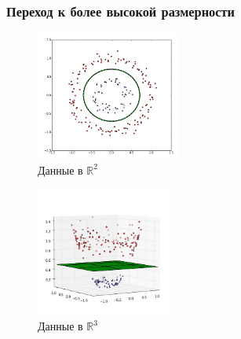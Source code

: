 \documentclass[12pt]{beamer}
\begin{document}
\begin{frame}\frametitle{Переход к более высокой размерности}
\begin{figure}[htbp]
	\begin{minipage}{.5\textwidth}
	  \includegraphics[height=120pt, keepaspectratio = true]{images/data-r2-1} \\
		\centering Данные в $\mathbb{R}^2$
    \end{minipage}%
    \begin{minipage}{.5\textwidth}
		\includegraphics[height=120pt, keepaspectratio = true]{images/data-r3-1}   \\
		\centering Данные в $\mathbb{R}^3$
	\end{minipage}%

\end{figure}
\end{frame}
\end{document}
